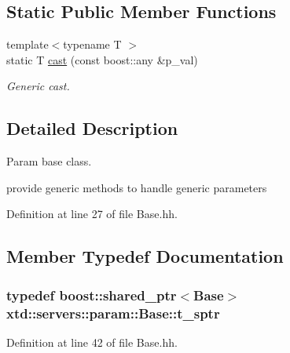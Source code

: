 \subsection*{Static Public Member Functions}
\begin{DoxyCompactItemize}
\item 
{\footnotesize template$<$typename T $>$ }\\static T \hyperlink{classxtd_1_1servers_1_1param_1_1Base_a6769f7c5e389cfd805e71634e774c329}{cast} (const boost\-::any \&p\-\_\-val)
\begin{DoxyCompactList}\small\item\em Generic cast. \end{DoxyCompactList}\end{DoxyCompactItemize}


\subsection{Detailed Description}
Param base class. 

provide generic methods to handle generic parameters 

Definition at line 27 of file Base.\-hh.



\subsection{Member Typedef Documentation}
\hypertarget{classxtd_1_1servers_1_1param_1_1Base_aaf4d92eca642f61cb81524096926c6a1}{
\subsubsection[{t\-\_\-sptr}]{\setlength{\rightskip}{0pt plus 5cm}typedef boost\-::shared\-\_\-ptr$<${\bf Base}$>$ {\bf xtd\-::servers\-::param\-::\-Base\-::t\-\_\-sptr}}}\label{classxtd_1_1servers_1_1param_1_1Base_aaf4d92eca642f61cb81524096926c6a1}


Definition at line 42 of file Base.\-hh.



